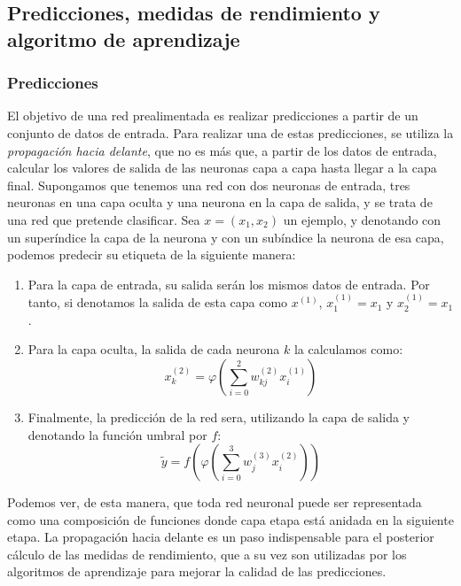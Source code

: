 \subsection{Predicciones, medidas de rendimiento y algoritmo de aprendizaje}

\subsubsection*{Predicciones}

El objetivo de una red prealimentada es realizar predicciones a partir de un conjunto de datos de entrada. Para 
realizar una de estas predicciones, se utiliza la \textit{propagación hacia delante}, que no es más que, a partir de
los datos de entrada, calcular los valores de salida de las neuronas capa a capa hasta llegar a la capa final. 
Supongamos que tenemos una red con dos neuronas de entrada, tres neuronas en una capa oculta y una neurona en la capa
de salida, y se trata de una red que pretende clasificar. Sea $x=(x_1,x_2)$ un ejemplo, y denotando con un superíndice 
la capa de la neurona y con un subíndice la neurona de esa capa, podemos predecir su etiqueta de la siguiente manera:
\begin{enumerate}
    \item Para la capa de entrada, su salida serán los mismos datos de entrada. Por tanto, si denotamos la salida de esta capa como $x^{(1)}$, $x^{(1)}_1=x_1$ y $x^{(1)}_2=x_1$.
    \item Para la capa oculta, la salida de cada neurona $k$ la calculamos como:
    \begin{equation}
        x^{(2)}_k=\varphi(\sum_{i=0}^2w^{(2)}_{kj}x^{(1)}_i)
    \end{equation}
    \item Finalmente, la predicción de la red sera, utilizando la capa de salida y denotando la función umbral por $f$:
    \begin{equation}
        \tilde{y}=f(\varphi(\sum_{i=0}^3w^{(3)}_jx^{(2)}_i))
    \end{equation}
\end{enumerate}

Podemos ver, de esta manera, que toda red neuronal puede ser representada como una composición de funciones donde capa
etapa está anidada en la siguiente etapa. La propagación hacia delante es un paso indispensable para el posterior 
cálculo de las medidas de rendimiento, que a su vez son utilizadas por los algoritmos de aprendizaje para mejorar la 
calidad de las predicciones\cite{mlp}. 

